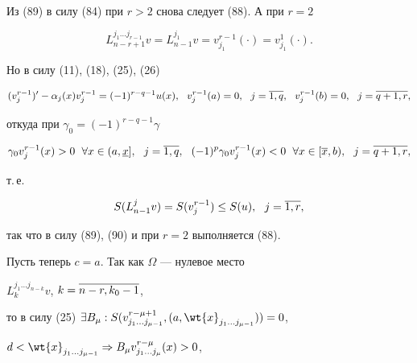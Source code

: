 \begin{pf}
\begin{gather}
\end{gather}


Из (89) в силу (84) при $r>2$ снова следует (88). А при $r=2$


\begin{equation}


L^{j_1\dotsc


j_{r-1}}_{n-r+1}v=L^{j_1}_{n-1}v=v^{r-1}_{j_1}(\cdot)=v^1_{j_1}(\cdot).


\end{equation}


Но в силу (11), (18), (25), (26)


\begin{equation}


(v^{r-1}_j)'-\alpha_j(x)v^{r-1}_j=(-1)^{r-q-1}u(x),\ \ v^{r-1}_{j}(a)=0,


\ \ j=\o{1,q},\ \ v^{r-1}_j(b)=0,\ \ j=\o{q+1,r},


\end{equation}


откуда при $\gamma_0=(-1)^{r-q-1}\gamma$


\begin{equation}


\gamma_0


v^{r-1}_j(x)>0\ \; \forall x\in(a,\u{x}],\ \ j=\overline{1,q},\ \ 


(-1)^p\gamma_0v^{r-1}_j(x)<0\ \; \forall x\in [\o{x},b),\ \ j=\o{q+1,r},


\end{equation}


т.\,е.


\begin{equation}


S(L_{n-1}^jv)=S(v^{r-1}_j)\le S(u),\ \ j=\o{1,r},


\end{equation}


так что в силу (89), (90) и при $r=2$ выполняется (88).





Пусть теперь $c=a$. Так как $\Omega$ --- нулевое место


$L^{j_1\dotsc j_{n-k}}_{k}v$, $k=\overline{n-r,k_0-1}$,


то в силу (25) $\exists B_{\mu}:


S(v^{r-\mu+1}_{j_1\dotsc j_{\mu-1}},(a,\wt{x}_{j_1\dotsc j_{\mu-1}}))=0$,


$d<\wt{x}_{j_1\dotsc j_{\mu-1}} \Rightarrow


B_{\mu}v^{r-\mu}_{j_1\dotsc j_{\mu}}(x)>0$,



\end{pf}
